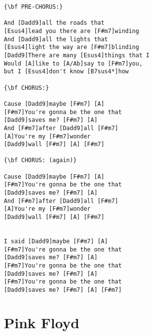 \documentclass[a4paper]{article}
\begin{document}
\begin{multicols}{2}
\begin{Verbatim}[commandchars=\\\{\}]
{\bf PRE-CHORUS:}

And [Dadd9]all the roads that 
[Esus4]lead you there are [F#m7]winding
And [Dadd9]all the lights that 
[Esus4]light the way are [F#m7]blinding
[Dadd9]There are many [Esus4]things that I 
Would [A]like to [A/Ab]say to [F#m7]you, 
but I [Esus4]don't know [B7sus4*]how

{\bf CHORUS:}

Cause [Dadd9]maybe [F#m7] [A]
[F#m7]You're gonna be the one that 
[Dadd9]saves me? [F#m7] [A]
And [F#m7]after [Dadd9]all [F#m7]
[A]You're my [F#m7]wonder
[Dadd9]wall [F#m7] [A] [F#m7] 

{\bf CHORUS: (again)}

Cause [Dadd9]maybe [F#m7] [A]
[F#m7]You're gonna be the one that 
[Dadd9]saves me? [F#m7] [A]
And [F#m7]after [Dadd9]all [F#m7]
[A]You're my [F#m7]wonder
[Dadd9]wall [F#m7] [A] [F#m7] 


I said [Dadd9]maybe [F#m7] [A]
[F#m7]You're gonna be the one that 
[Dadd9]saves me? [F#m7] [A]
[F#m7]You're gonna be the one that 
[Dadd9]saves me? [F#m7] [A]
[F#m7]You're gonna be the one that 
[Dadd9]saves me? [F#m7] [A] [F#m7]
\end{Verbatim}
\newpage
\end{multicols}
\section{Pink Floyd} %
\label{sec:Pink Floyi}
\end{document}
